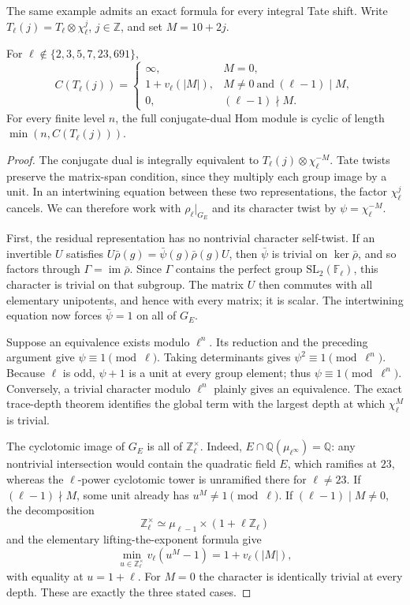 The same example admits an exact formula for every integral Tate shift.
Write $T_\ell(j)=T_\ell\otimes\chi_\ell^j$, $j\in\mathbb Z$, and set
$M=10+2j$.

\begin{theorem}
\label{thm:delta-all-twists}
For $\ell\notin\{2,3,5,7,23,691\}$,
\[
 C(T_\ell(j))=
 \begin{cases}
 \infty,&M=0,\\
 1+v_\ell(|M|),&M\ne0\ \text{and}\ (\ell-1)\mid M,\\
 0,&(\ell-1)\nmid M.
 \end{cases}
\]
For every finite level $n$, the full conjugate-dual Hom module is
cyclic of length $\min(n,C(T_\ell(j)))$.
\end{theorem}
\begin{proof}
The conjugate dual is integrally equivalent to
$T_\ell(j)\otimes\chi_\ell^{-M}$.  Tate twists preserve the matrix-span
condition, since they multiply each group image by a unit.  In an
intertwining equation between these two representations, the factor
$\chi_\ell^j$ cancels.  We can therefore work with $\rho_\ell|_{G_E}$
and its character twist by $\psi=\chi_\ell^{-M}$.

First, the residual representation has no nontrivial character
self-twist.  If an invertible $U$ satisfies
$U\bar\rho(g)=\bar\psi(g)\bar\rho(g)U$, then
$\bar\psi$ is trivial on $\ker\bar\rho$, and so factors through
$\Gamma=\operatorname{im}\bar\rho$.
Since $\Gamma$ contains the perfect group
$\mathrm{SL}_2(\mathbb F_\ell)$, this character is trivial on that
subgroup.  The matrix $U$ then commutes with all elementary unipotents,
and hence with every matrix; it is scalar.  The intertwining equation
now forces $\bar\psi=1$ on all of $G_E$.

Suppose an equivalence exists modulo $\ell^n$.  Its reduction and the
preceding argument give $\psi\equiv1\pmod\ell$.
Taking determinants gives $\psi^2\equiv1\pmod{\ell^n}$.
Because $\ell$ is odd, $\psi+1$ is a unit at every group element;
thus $\psi\equiv1\pmod{\ell^n}$.  Conversely, a trivial character
modulo $\ell^n$ plainly gives an equivalence.  The exact trace-depth
theorem identifies the global term with the largest depth at which
$\chi_\ell^M$ is trivial.

The cyclotomic image of $G_E$ is all of $\mathbb Z_\ell^\times$.
Indeed, $E\cap\mathbb Q(\mu_{\ell^\infty})=\mathbb Q$:
any nontrivial intersection would contain the quadratic field $E$,
which ramifies at $23$, whereas the $\ell$-power cyclotomic tower is
unramified there for $\ell\ne23$.
If $(\ell-1)\nmid M$, some unit already has $u^M\ne1\pmod\ell$.
If $(\ell-1)\mid M\ne0$, the decomposition
\[
 \mathbb Z_\ell^\times\simeq\mu_{\ell-1}\times(1+\ell\mathbb Z_\ell)
\]
and the elementary lifting-the-exponent formula give
\[
 \min_{u\in\mathbb Z_\ell^\times}v_\ell(u^M-1)
  =1+v_\ell(|M|),
\]
with equality at $u=1+\ell$.  For $M=0$ the character is identically
trivial at every depth.  These are exactly the three stated cases.
\end{proof}

